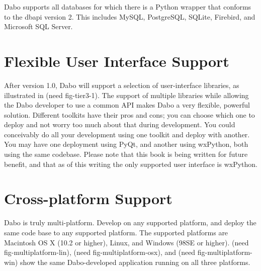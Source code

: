 Dabo supports all databases for which there is a Python wrapper that conforms to 
the dbapi version 2. This includes MySQL, PostgreSQL, SQLite, Firebird, and 
Microsoft SQL Server. 

\section{Flexible User Interface Support}

After version 1.0, Dabo will support a selection of user-interface libraries, as 
illustrated in (need fig-tier3-1). The support of multiple libraries while allowing the 
Dabo developer to use a common API makes Dabo a very flexible, powerful solution. 
Different toolkits have their pros and cons; you can choose which one to deploy 
and not worry too much about that during development. You could conceivably do 
all your development using one toolkit and deploy with another. You may have one 
deployment using PyQt, and another using wxPython, both using the same codebase. 
Please note that this book is being written for future benefit, and that as of this 
writing the only supported user interface is wxPython.

\section{Cross-platform Support}

Dabo is truly multi-platform. Develop on any supported platform, and deploy the 
same code base to any supported platform. The supported platforms are Macintosh 
OS X (10.2 or higher), Linux, and Windows (98SE or higher). (need 
fig-multiplatform-lin), (need fig-multiplatform-osx), and (need fig-multiplatform-win) 
show the same Dabo-developed application running on all three platforms.
